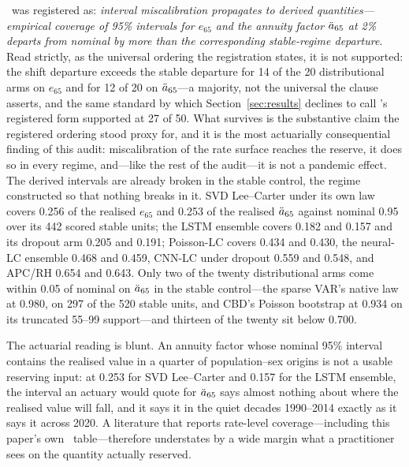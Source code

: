 \Hfive\ was registered as: \emph{interval miscalibration propagates to
derived quantities---empirical coverage of 95\% intervals for $e_{65}$ and
the annuity factor $\ddot{a}_{65}$ at 2\% departs from nominal by more than the
corresponding stable-regime departure}. Read strictly, as the universal
ordering the registration states, it is not supported: the shift departure
exceeds the stable departure for 14 of the 20 distributional arms on
$e_{65}$ and for 12 of 20 on $\ddot{a}_{65}$---a majority, not the universal the
clause asserts, and the same standard by which Section~\ref{sec:results}
declines to call \Htwo's registered form supported at 27 of 50. What
survives is the
substantive claim the registered ordering stood proxy for, and it is the
most actuarially consequential finding of this audit: miscalibration of the
rate surface reaches the reserve, it does so in every regime, and---like
the rest of the audit---it is not a pandemic effect. The derived intervals
are already broken in the stable control, the regime constructed so that
nothing breaks in it. SVD Lee--Carter under its own law covers 0.256 of the
realised $e_{65}$ and 0.253 of the realised $\ddot{a}_{65}$ against nominal 0.95
over its 442 scored stable units; the LSTM ensemble covers 0.182 and 0.157 and its
dropout arm 0.205 and 0.191; Poisson-LC covers 0.434 and 0.430, the
neural-LC ensemble 0.468 and 0.459, CNN-LC under dropout 0.559 and 0.548,
and APC/RH 0.654 and 0.643. Only two of the twenty distributional arms come
within 0.05 of nominal on $\ddot{a}_{65}$ in the stable control---the sparse
VAR's native law at 0.980, on 297 of the 520 stable units, and CBD's
Poisson bootstrap at 0.934 on its truncated 55--99 support---and thirteen
of the twenty sit below 0.700.

The actuarial reading is blunt. An annuity factor whose nominal 95\%
interval contains the realised value in a quarter of population--sex
origins is not a usable reserving input: at 0.253 for SVD Lee--Carter and
0.157 for the LSTM ensemble, the interval an actuary would quote for
$\ddot{a}_{65}$ says almost nothing about where the realised value will fall,
and it says it in the quiet decades 1990--2014 exactly as it says it across
2020. A literature that reports rate-level coverage---including this
paper's own \Htwo\ table---therefore understates by a wide margin what a
practitioner sees on the quantity actually reserved.

